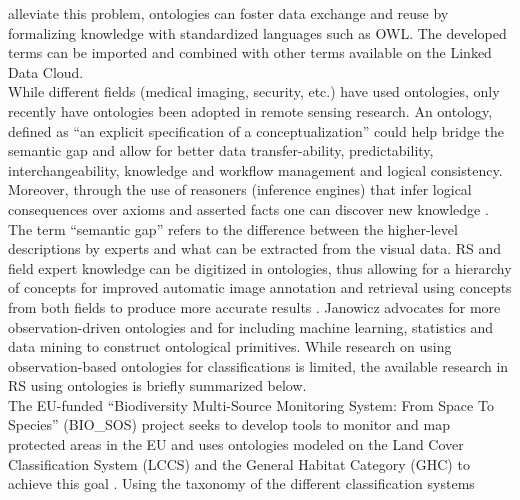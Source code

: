 \documentclass[authoryear, review,12pt,number]{elsarticle}
\begin{document}
alleviate this problem, ontologies can foster data exchange and reuse by
formalizing knowledge with standardized languages such as OWL. The developed
terms can be imported and combined with other terms available on the Linked Data
Cloud.
\\
While different fields (medical imaging, security, etc.) have used ontologies,
only recently have ontologies been adopted in remote sensing research. An
ontology, defined  as ``an explicit specification of a conceptualization''
\citep{gruber1993} could help bridge the semantic gap and allow for better data
transfer-ability, predictability, interchangeability, knowledge and workflow
management and logical consistency. Moreover, through the use of reasoners
(inference engines) that infer logical consequences over axioms and asserted 
facts one can discover new knowledge \citep{Arvor2013, Andres2013a}. The term
``semantic gap'' refers to the difference between the higher-level descriptions
by experts and what can be extracted from the visual data. RS and
field expert knowledge can be digitized in ontologies, thus allowing for a
hierarchy of concepts for improved automatic image annotation and retrieval
using concepts from both fields to produce more accurate results
\cite{Srikanth:2005:EOA:1076034.1076128}. Janowicz \cite{Janowicz2012} advocates
for more observation-driven ontologies and for including machine learning,
statistics and data mining to construct ontological primitives. While
research on using observation-based ontologies for classifications is limited,
the available research in RS using ontologies is briefly summarized below.
\\
The EU-funded ``Biodiversity Multi-Source Monitoring System: From Space To
Species'' (BIO\_SOS) project seeks to develop tools to monitor and map protected
areas in the EU and uses ontologies modeled on the Land Cover Classification
System (LCCS) and the General Habitat Category (GHC) to achieve this goal
\citep{Arvor2013}. Using the taxonomy of the different classification systems
\end{document}
